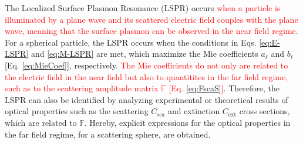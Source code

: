 
The Localized Surface Plasmon Resonance (LSPR) occurs \textcolor{red}{when a particle is illuminated by a plane wave and its scattered electric field couples with the plane wave,  meaning that the surface plasmon can be observed in the near field regime}. For a spherical particle, the LSPR occurs when the conditions in Eqs. \eqref{eq:E-LSPR} and \eqref{eq:M-LSPR} are met, which maximize the Mie coefficients  $a_\ell$ and $b_\ell$ [Eq. \eqref{eq:MieCoef}], respectively. \textcolor{red}{The Mie coefficients do not only are related to the electric field in the near field but also to quantitites in the far field regime, such as to the scattering amplitude matrix $\mathbb{F}$ [Eq. \eqref{eq:FscaS}]}. Therefore, the LSPR can also be identified by analyzing experimental or theoretical results of optical properties such as the scattering $C_\text{sca}$ and extinction $C_\text{ext}$ cross sections, which are related to $\mathbb{F}$.  Hereby, explicit expressions for the optical properties in the far field regime, for a scattering sphere, are obtained.

